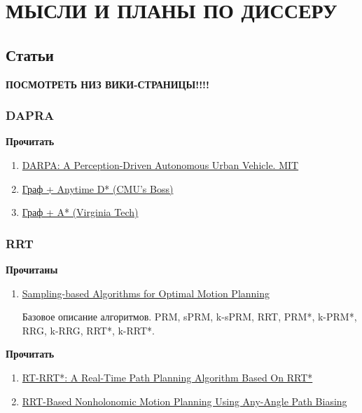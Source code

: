 \documentclass[a4paper,12pt,preview,tikz]{report}
\begin{document}
\chapter{МЫСЛИ И ПЛАНЫ ПО ДИССЕРУ}

\section{Статьи}

\textbf{ПОСМОТРЕТЬ НИЗ ВИКИ-СТРАНИЦЫ!!!!}

\subsection{DAPRA}

\textbf{Прочитать}
\begin{enumerate}
    \item \href{http://acl.mit.edu/papers/LeonardJFR08.pdf}{DARPA: A Perception-Driven Autonomous Urban Vehicle. MIT} 
    \item \href{https://www.ri.cmu.edu/pub_files/pub4/urmson_christopher_2008_1/urmson_christopher_2008_1.pdf}{Граф + Anytime D* (CMU’s Boss)}
    \item \href{https://www.romela.org/wp-content/uploads/2015/05/Odin-Team-VictorTango%E2%80%99s-Entry-in-the-DARPA-Urban-Challenge.pdf}{Граф + A* (Virginia Tech)}

\end{enumerate}

\subsection{RRT}

\textbf{Прочитаны}
\begin{enumerate}
    \item \href{https://arxiv.org/pdf/1105.1186.pdf}{Sampling-based Algorithms for Optimal Motion Planning}

        Базовое описание алгоритмов. PRM, sPRM, k-sPRM, RRT, PRM*, k-PRM*, RRG, k-RRG, RRT*, k-RRT*. 
\end{enumerate}

\textbf{Прочитать}
\begin{enumerate}
    \item \href{https://users.aalto.fi/~hamalap5/FutureGameAnimation/p113-naderi.pdf}{RT-RRT*: A Real-Time Path Planning Algorithm Based On RRT*}
    \item \href{http://idm-lab.org/bib/abstracts/papers/icra16.pdf}{RRT-Based Nonholonomic Motion Planning Using Any-Angle Path Biasing} 

\end{enumerate}
\end{document}
